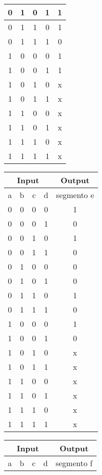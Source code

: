 \begin{figure}[!hbp]
{{\begin{tabular}[b]{|c|c|c|c|c|}
            0&1&0&1&1\\\hline
            0&1&1&0&1\\\hline
            0&1&1&1&0\\\hline
            1&0&0&0&1\\\hline
            1&0&0&1&1\\\hline
            1&0&1&0&x\\\hline
            1&0&1&1&x\\\hline
            1&1&0&0&x\\\hline
            1&1&0&1&x\\\hline
            1&1&1&0&x\\\hline
            1&1&1&1&x\\\hline
          \end{tabular}
        }
    {
      \begin{tabular}[b]{|c|c|c|c|c|}
        \hline
        \multicolumn{4}{|c|}{Input}&\multicolumn{1}{|c|}{Output}\\\hline
        a&b&c&d&segmento e\\\hline
        0&0&0&0&1\\\hline
        0&0&0&1&0\\\hline
        0&0&1&0&1\\\hline
        0&0&1&1&0\\\hline
        0&1&0&0&0\\\hline
        0&1&0&1&0\\\hline
        0&1&1&0&1\\\hline
        0&1&1&1&0\\\hline
        1&0&0&0&1\\\hline
        1&0&0&1&0\\\hline
        1&0&1&0&x\\\hline
        1&0&1&1&x\\\hline
        1&1&0&0&x\\\hline
        1&1&0&1&x\\\hline
        1&1&1&0&x\\\hline
        1&1&1&1&x\\\hline
      \end{tabular}
    }
    {
      \begin{tabular}[b]{|c|c|c|c|c|}
        \hline
        \multicolumn{4}{|c|}{Input}&\multicolumn{1}{|c|}{Output}\\\hline
        a&b&c&d&segmento f\\\hline

\end{tabular}}}
\end{figure}
